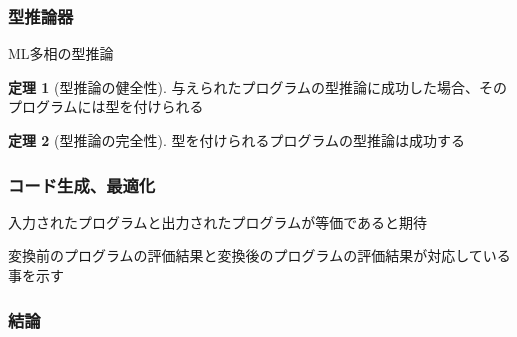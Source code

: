 \documentclass[dvipdfmx,cjk,xcolor=dvipsnames,envcountsect,notheorems,12pt]{beamer}
\theoremstyle{definition}
\newtheorem{theorem}{定理}
\begin{document}
\begin{frame}
	\frametitle{型推論器}
	{\Large ML多相の型推論}
  \begin{theorem}[型推論の健全性]
		与えられたプログラムの型推論に成功した場合、そのプログラムには型を付けられる
  \end{theorem}
  \begin{theorem}[型推論の完全性]
		型を付けられるプログラムの型推論は成功する
  \end{theorem}
\end{frame}

\begin{frame}
	\frametitle{コード生成、最適化}
	\Large 入力されたプログラムと出力されたプログラムが等価であると期待

	\vfill

	変換前のプログラムの評価結果と変換後のプログラムの評価結果が対応している事を示す
\end{frame}

\begin{frame}
	\frametitle{結論}
	\large

	\pause

	\Huge
\end{frame}
\end{document}
